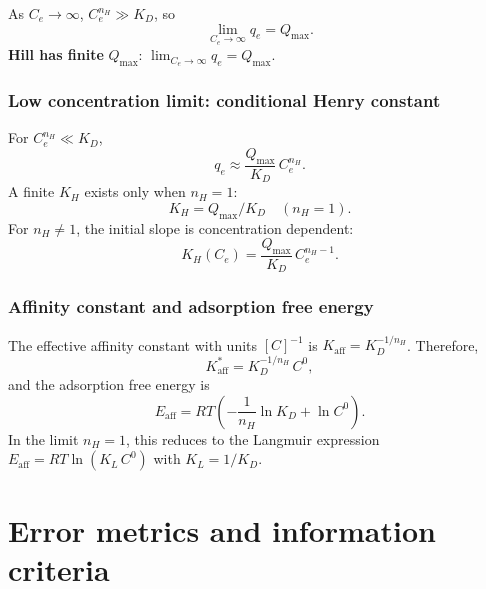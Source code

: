 \documentclass[journal=aamick,manuscript=article]{achemso}
\begin{document}
As $C_e \to \infty$, $C_e^{n_H} \gg K_D$, so
\begin{equation}
	\lim_{C_e \to \infty} q_e = Q_{\max}.
\end{equation}
\textbf{Hill has finite }$Q_{\max}$:\quad
$\displaystyle \lim_{C_e \to \infty} q_e = Q_{\max}$.

\subsubsection{Low concentration limit: conditional Henry constant}

For $C_e^{n_H} \ll K_D$,
\begin{equation}
	q_e \approx \frac{Q_{\max}}{K_D}\, C_e^{n_H}.
\end{equation}
A finite $K_H$ exists only when $n_H = 1$:
\begin{equation}
	K_H = Q_{\max}/K_D \quad (n_H = 1).
\end{equation}
For $n_H \neq 1$, the initial slope is concentration dependent:
\begin{equation}
	K_H(C_e) = \frac{Q_{\max}}{K_D}\, C_e^{n_H - 1}.
\end{equation}

\subsubsection{Affinity constant and adsorption free energy}

The effective affinity constant with units $[C]^{-1}$ is
$K_{\mathrm{aff}} = K_D^{-1/n_H}$. Therefore,
\begin{equation}
	K_{\mathrm{aff}}^{\ast} = K_D^{-1/n_H}\, C^0,
\end{equation}
and the adsorption free energy is
\begin{equation}
	\boxed{
		E_{\mathrm{aff}} = RT\!\left(-\frac{1}{n_H}\ln K_D + \ln C^0\right).
	}
\end{equation}
In the limit $n_H = 1$, this reduces to the Langmuir expression
$E_{\mathrm{aff}} = RT\ln(K_L\, C^0)$ with $K_L = 1/K_D$.
	

	
\section{Error metrics and information criteria}
\label{sec:si_error_metrics}
\end{document}
